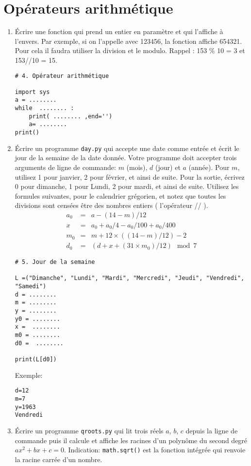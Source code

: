 \documentclass[a4paper]{article}
\begin{document}
\section{Opérateurs arithmétique}
\begin{enumerate}
\item Écrire une fonction qui prend un entier en paramètre et qui l'affiche à l'envers. Par exemple, si on l'appelle avec 123456, la fonction affiche 654321. Pour cela il faudra utiliser la division et le modulo. Rappel : 153 \% 10 = 3 et 153//10 = 15.

\begin{lstlisting}
# 4. Opérateur arithmétique

import sys
a = ........
while  ........ :
    print( ........ ,end='')
    a= ........
print()
\end{lstlisting}

\item Écrire un programme {\tt day.py} qui accepte une date comme entrée et écrit le jour de la semaine de la date donnée. Votre programme doit accepter trois arguments de ligne de commande: $m$ (mois), $d$ (jour) et $a$
(année). Pour $m$, utilisez 1 pour janvier, 2 pour février, et ainsi de suite. Pour la sortie, écrivez 0 pour dimanche, 1 pour
Lundi, 2 pour mardi, et ainsi de suite.
Utilisez les formules suivantes, pour le calendrier grégorien, et notez que toutes les divisions sont censées être des nombres entiers ( l'opérateur // ).
\[
\begin{array}{lcl}
a_0 &= &a - (14 - m)/12\\
x & = & a_0 + a_0/4 - a_0/100 + a_0/400\\
m_0 & = & m + 12 \times ( (14 - m) / 12) - 2\\
d_0 & = &  (d + x + (31\times m_0)/12) \mod 7
\end{array}
\]

\begin{lstlisting}
# 5. Jour de la semaine

L =("Dimanche", "Lundi", "Mardi", "Mercredi", "Jeudi", "Vendredi", "Samedi")
d = ........
m = ........
y = ........
y0 = ........
x =  ........
m0 = ........
d0 =  ........

print(L[d0])
\end{lstlisting}
Exemple:
\begin{verbatim}
d=12
m=7
y=1963
Vendredi
\end{verbatim}

\item Écrire un programme {\tt qroots.py} qui lit trois réels $a$, $b$, $c$ depuis la ligne de commande puis il calcule et affiche les racines d'un polynôme du second degré  $ax^2 + bx + c = 0$.
Indication: {\tt math.sqrt()} est la fonction intégrée qui renvoie la racine carrée d'un nombre.


\end{enumerate}
\end{document}
